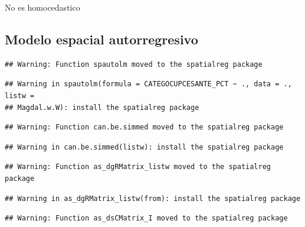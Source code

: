 \documentclass[11pt,]{article}
\newenvironment{Shaded}{\begin{snugshade}}{\end{snugshade}}
\newcommand{\KeywordTok}[1]{\textcolor[rgb]{0.13,0.29,0.53}{\textbf{#1}}}
\newcommand{\DataTypeTok}[1]{\textcolor[rgb]{0.13,0.29,0.53}{#1}}
\newcommand{\StringTok}[1]{\textcolor[rgb]{0.31,0.60,0.02}{#1}}
\newcommand{\OperatorTok}[1]{\textcolor[rgb]{0.81,0.36,0.00}{\textbf{#1}}}
\newcommand{\NormalTok}[1]{#1}
\begin{document}
No es homocedastico

\subsection{Modelo espacial
autorregresivo}\label{modelo-espacial-autorregresivo}

\begin{Shaded}
\end{Shaded}

\begin{verbatim}
## Warning: Function spautolm moved to the spatialreg package
\end{verbatim}

\begin{verbatim}
## Warning in spautolm(formula = CATEGOCUPCESANTE_PCT ~ ., data = ., listw =
## Magdal.w.W): install the spatialreg package
\end{verbatim}

\begin{verbatim}
## Warning: Function can.be.simmed moved to the spatialreg package
\end{verbatim}

\begin{verbatim}
## Warning in can.be.simmed(listw): install the spatialreg package
\end{verbatim}

\begin{verbatim}
## Warning: Function as_dgRMatrix_listw moved to the spatialreg package
\end{verbatim}

\begin{verbatim}
## Warning in as_dgRMatrix_listw(from): install the spatialreg package
\end{verbatim}

\begin{verbatim}
## Warning: Function as_dsCMatrix_I moved to the spatialreg package
\end{verbatim}
\end{document}
